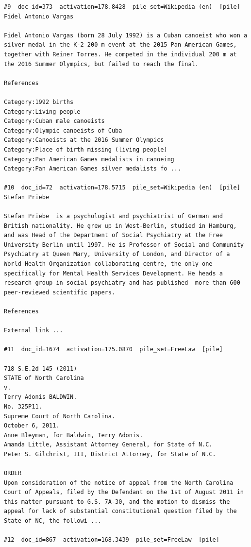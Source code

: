 \begin{verbatim}
#9  doc_id=373  activation=178.8428  pile_set=Wikipedia (en)  [pile]
Fidel Antonio Vargas

Fidel Antonio Vargas (born 28 July 1992) is a Cuban canoeist who won a silver medal in the K-2 200 m event at the 2015 Pan American Games, together with Reiner Torres. He competed in the individual 200 m at the 2016 Summer Olympics, but failed to reach the final.

References

Category:1992 births
Category:Living people
Category:Cuban male canoeists
Category:Olympic canoeists of Cuba
Category:Canoeists at the 2016 Summer Olympics
Category:Place of birth missing (living people)
Category:Pan American Games medalists in canoeing
Category:Pan American Games silver medalists fo ...

#10  doc_id=72  activation=178.5715  pile_set=Wikipedia (en)  [pile]
Stefan Priebe

Stefan Priebe  is a psychologist and psychiatrist of German and British nationality. He grew up in West-Berlin, studied in Hamburg, and was Head of the Department of Social Psychiatry at the Free University Berlin until 1997. He is Professor of Social and Community Psychiatry at Queen Mary, University of London, and Director of a World Health Organization collaborating centre, the only one specifically for Mental Health Services Development. He heads a research group in social psychiatry and has published  more than 600 peer-reviewed scientific papers.

References

External link ...

#11  doc_id=1674  activation=175.0870  pile_set=FreeLaw  [pile]

718 S.E.2d 145 (2011)
STATE of North Carolina
v.
Terry Adonis BALDWIN.
No. 325P11.
Supreme Court of North Carolina.
October 6, 2011.
Anne Bleyman, for Baldwin, Terry Adonis.
Amanda Little, Assistant Attorney General, for State of N.C.
Peter S. Gilchrist, III, District Attorney, for State of N.C.

ORDER
Upon consideration of the notice of appeal from the North Carolina Court of Appeals, filed by the Defendant on the 1st of August 2011 in this matter pursuant to G.S. 7A-30, and the motion to dismiss the appeal for lack of substantial constitutional question filed by the State of NC, the followi ...

#12  doc_id=867  activation=168.3439  pile_set=FreeLaw  [pile]













\end{verbatim}
